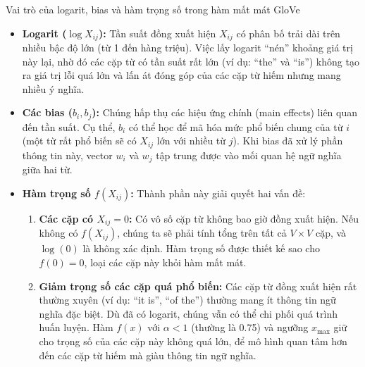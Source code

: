 \begin{deepdive}{Vai trò của logarit, bias và hàm trọng số trong hàm mất mát GloVe}
\begin{itemize}
    \item \textbf{Logarit ($\log X_{ij}$):} Tần suất đồng xuất hiện $X_{ij}$ có phân bố trải dài trên nhiều bậc độ lớn (từ 1 đến hàng triệu). Việc lấy logarit “nén” khoảng giá trị này lại, nhờ đó các cặp từ có tần suất rất lớn (ví dụ: “the” và “is”) không tạo ra giá trị lỗi quá lớn và lấn át đóng góp của các cặp từ hiếm nhưng mang nhiều ý nghĩa.

    \item \textbf{Các bias ($b_i, b_j$):} Chúng hấp thụ các hiệu ứng chính (main effects) liên quan đến tần suất. Cụ thể, $b_i$ có thể học để mã hóa mức phổ biến chung của từ $i$ (một từ rất phổ biến sẽ có $X_{ij}$ lớn với nhiều từ $j$). Khi bias đã xử lý phần thông tin này, vector $w_i$ và $w_j$ tập trung được vào mối quan hệ ngữ nghĩa giữa hai từ.

    \item \textbf{Hàm trọng số $f(X_{ij})$:} Thành phần này giải quyết hai vấn đề:
    \begin{enumerate}
        \item \textbf{Các cặp có $X_{ij} = 0$:} Có vô số cặp từ không bao giờ đồng xuất hiện. Nếu không có $f(X_{ij})$, chúng ta sẽ phải tính tổng trên tất cả $V \times V$ cặp, và $\log(0)$ là không xác định. Hàm trọng số được thiết kế sao cho $f(0) = 0$, loại các cặp này khỏi hàm mất mát.
        \item \textbf{Giảm trọng số các cặp quá phổ biến:} Các cặp từ đồng xuất hiện rất thường xuyên (ví dụ: “it is”, “of the”) thường mang ít thông tin ngữ nghĩa đặc biệt. Dù đã có logarit, chúng vẫn có thể chi phối quá trình huấn luyện. Hàm $f(x)$ với $\alpha < 1$ (thường là 0.75) và ngưỡng $x_{\text{max}}$ giữ cho trọng số của các cặp này không quá lớn, để mô hình quan tâm hơn đến các cặp từ hiếm mà giàu thông tin ngữ nghĩa.
    \end{enumerate}
\end{itemize}
\end{deepdive}

